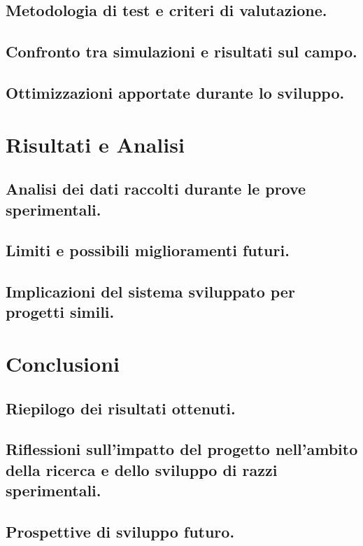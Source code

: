 \documentclass[12pt,a4paper,twoside]{book}
\begin{document}
\section{Metodologia di test e criteri di valutazione.}
\section{Confronto tra simulazioni e risultati sul campo.}
\section{Ottimizzazioni apportate durante lo sviluppo.}

\chapter{Risultati e Analisi} \label{chap:results}

\section{Analisi dei dati raccolti durante le prove sperimentali.}
\section{Limiti e possibili miglioramenti futuri.}
\section{Implicazioni del sistema sviluppato per progetti simili.}

\chapter{Conclusioni} \label{chap:conclusion}

\section{Riepilogo dei risultati ottenuti.}
\section{Riflessioni sull'impatto del progetto nell'ambito della ricerca e dello sviluppo di razzi sperimentali.}
\section{Prospettive di sviluppo futuro.}
\end{document}
